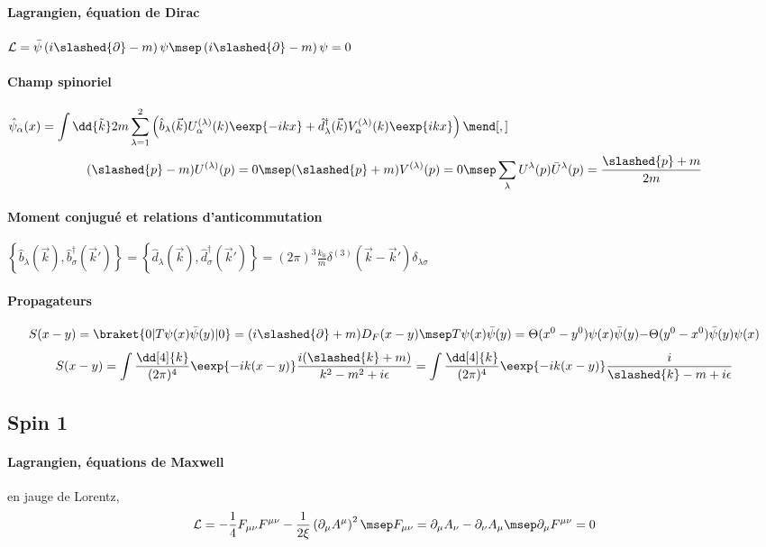 \documentclass{article}
\begin{document}
\paragraph{Lagrangien, équation de Dirac}$\displaystyle
\mathcal{L} = \bar{\psi}\left(i\slashed{\partial}-m\right)\psi
\msep
\left(i\slashed{\partial}-m\right)\psi=0$
\paragraph{Champ spinoriel}$\displaystyle
\hat{\psi}_\alpha(x) = \int\dd{\tilde{k}} 2m \sum_{\lambda=1}^2 \left( \hat{b}_\lambda(\vec{k})U_\alpha^{(\lambda)}(k)\eexp{-ikx} + \hat{d}^\dagger_\lambda(\vec{k})V_\alpha^{(\lambda)}(k)\eexp{ikx} \right)
\mend[,]$
\begin{gather*}
(\slashed{p}-m)U^{(\lambda)}(p)=0
\msep
(\slashed{p}+m)V^{(\lambda)}(p)=0
\msep
\sum_\lambda U^\lambda(p)\bar{U}^\lambda(p)=\frac{\slashed{p}+m}{2m}
\end{gather*}
\paragraph{Moment conjugué et relations d'anticommutation}$\displaystyle
\left\lbrace \hat{b}_\lambda(\vec{k}), \hat{b}^\dagger_\sigma(\vec{k}') \right\rbrace =
\left\lbrace \hat{d}_\lambda(\vec{k}), \hat{d}^\dagger_\sigma(\vec{k}') \right\rbrace =
(2\pi)^3 \frac{k_0}{m} \delta^{(3)}(\vec{k}-\vec{k}') \delta_{\lambda\sigma}$
\paragraph{Propagateurs}
\begin{align*}
S(x-y) = \braket{0|T\psi(x)\bar{\psi}(y)|0} = (i\slashed{\partial}+m)D_F(x-y)
\msep
T\psi(x)\bar{\psi}(y) = \Theta(x^0-y^0)\psi(x)\bar{\psi}(y) {-} \Theta(y^0-x^0)\bar{\psi}(y)\psi(x)
\end{align*}
\begin{align*}
S(x-y) = \int\frac{\dd[4]{k}}{(2\pi)^4}\eexp{-ik(x-y)} \frac{i(\slashed{k}+m)}{k^2-m^2+i\epsilon}
 = \int\frac{\dd[4]{k}}{(2\pi)^4}\eexp{-ik(x-y)} \frac{i}{\slashed{k}-m+i\epsilon}
\end{align*}

\subsection{Spin 1}
\paragraph{Lagrangien, équations \og de Maxwell \fg} en jauge de Lorentz,
\begin{align*}
\mathcal{L}= -\frac{1}{4}F_{\mu\nu}F^{\mu\nu} - \frac{1}{2\xi}\left(\partial_\mu A^\mu\right)^2
\msep
F_{\mu\nu} = \partial_\mu A_\nu-\partial_\nu A_\mu
\msep
\partial_\mu F^{\mu\nu} = 0
\end{align*}
\end{document}
